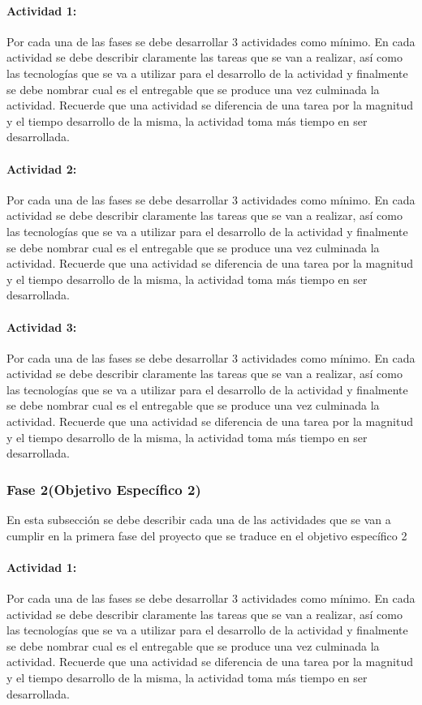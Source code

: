 \paragraph{Actividad 1:} Por cada una de las fases se debe desarrollar 3 actividades como mínimo. En cada actividad se debe describir claramente las tareas que se van a realizar, así como las tecnologías que se va a utilizar para el desarrollo de la actividad y finalmente se debe nombrar cual es el entregable que se produce una vez culminada la actividad. Recuerde que una actividad se diferencia de una tarea por la magnitud y el tiempo desarrollo de la misma, la actividad toma más tiempo en ser desarrollada. 

\paragraph{Actividad 2:} Por cada una de las fases se debe desarrollar 3 actividades como mínimo. En cada actividad se debe describir claramente las tareas que se van a realizar, así como las tecnologías que se va a utilizar para el desarrollo de la actividad y finalmente se debe nombrar cual es el entregable que se produce una vez culminada la actividad. Recuerde que una actividad se diferencia de una tarea por la magnitud y el tiempo desarrollo de la misma, la actividad toma más tiempo en ser desarrollada.

\paragraph{Actividad 3:} Por cada una de las fases se debe desarrollar 3 actividades como mínimo. En cada actividad se debe describir claramente las tareas que se van a realizar, así como las tecnologías que se va a utilizar para el desarrollo de la actividad y finalmente se debe nombrar cual es el entregable que se produce una vez culminada la actividad. Recuerde que una actividad se diferencia de una tarea por la magnitud y el tiempo desarrollo de la misma, la actividad toma más tiempo en ser desarrollada.

\subsubsection{Fase 2(Objetivo Específico 2)}
En esta subsección se debe describir cada una de las actividades que se van a cumplir en la primera fase del proyecto que se traduce en el objetivo específico 2
\paragraph{Actividad 1:} Por cada una de las fases se debe desarrollar 3 actividades como mínimo. En cada actividad se debe describir claramente las tareas que se van a realizar, así como las tecnologías que se va a utilizar para el desarrollo de la actividad y finalmente se debe nombrar cual es el entregable que se produce una vez culminada la actividad. Recuerde que una actividad se diferencia de una tarea por la magnitud y el tiempo desarrollo de la misma, la actividad toma más tiempo en ser desarrollada. 

